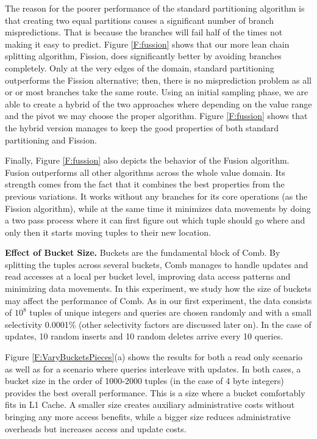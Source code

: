 The reason for the poorer performance of the standard partitioning algorithm is that creating two 
equal partitions causes a significant number of branch mispredictions.
That is because the branches will fail half of the times not making it easy to predict.
Figure \ref{F:fussion} shows that our more lean chain splitting algorithm, Fission, does significantly better
by avoiding branches completely. 
Only at the very edges of the domain, standard partitioning outperforms the Fission alternative; 
then, there is no misprediction problem as all or or most branches take the same route.
Using an initial sampling phase, we are able to create a hybrid of the two approaches
where depending on the value range and the pivot we may choose the proper algorithm.
Figure \ref{F:fussion} shows that the hybrid version manages to keep the good properties of both standard partitioning and Fission.

Finally, Figure \ref{F:fussion} also depicts the behavior of the Fusion algorithm.
Fusion outperforms all other algorithms across the whole value domain.
Its strength comes from the fact that it combines the best properties from the previous variations.
It works without any branches for its core operations (as the Fission algorithm), 
while at the same time it minimizes data movements 
by doing a two pass process where it can first figure out which tuple should go where
and only then it starts moving tuples to their new location.   

 

\textbf{Effect of Bucket Size.}
Buckets are the fundamental block of Comb. 
By splitting the tuples across several buckets, Comb manages to 
handle updates and read accesses at a local per bucket level, improving 
data access patterns and minimizing data movements.
In this experiment, we study how the size of buckets may affect the performance of Comb.
As in our first experiment, the data consists of $10^8$ tuples of unique integers and queries
are chosen randomly and with a small selectivity 0.0001\%
(other selectivity factors are discussed later on). 
In the case of updates, 10 random inserts and 10 random deletes arrive every 10 queries.

Figure \ref{F:VaryBucketsPieces}(a) shows the results for both a read only scenario as well as for
a scenario where queries interleave with updates.
In both cases, a bucket size in the order of 1000-2000 tuples (in the case of 4 byte integers)
provides the best overall performance. This is a size where a bucket comfortably fits in L1 Cache.
A smaller size creates auxiliary administrative costs without bringing any more access benefits, while
a bigger size reduces administrative overheads but increases access and update costs.

